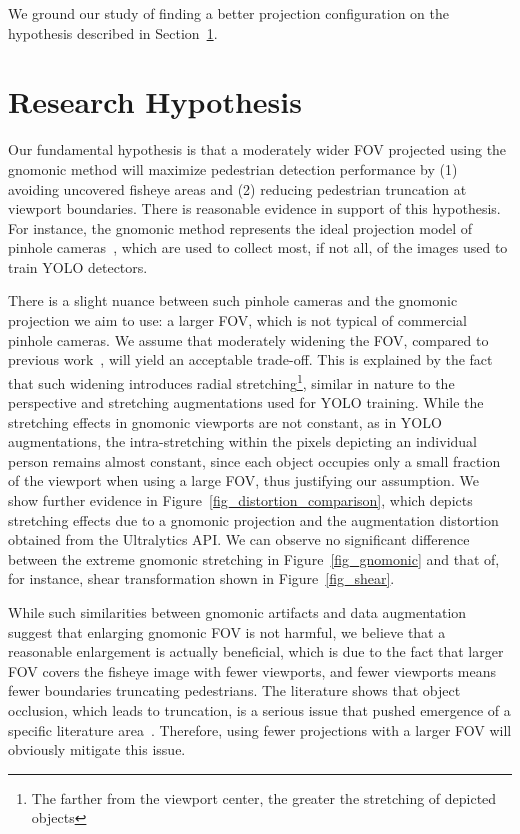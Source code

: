 \documentclass[twocolumn]{svjour3}          %
\begin{document}
We ground our study of finding a better projection configuration on the hypothesis described in Section~\ref{sec_hypothesis}.


\section{Research Hypothesis}
\label{sec_hypothesis}
Our fundamental hypothesis is that a moderately wider FOV projected using the gnomonic method will maximize pedestrian detection performance by (1) avoiding uncovered fisheye areas and (2) reducing pedestrian truncation at viewport boundaries. There is reasonable evidence in support of this hypothesis. For instance, the gnomonic method represents the ideal projection model of pinhole cameras~\cite{pegoraro2016handbook, billings2020silhonet}, which are used to collect most, if not all, of the images used to train YOLO detectors. 

There is a slight nuance between such pinhole cameras and the gnomonic projection we aim to use: a larger FOV, which is not typical of commercial pinhole cameras. We assume that moderately widening the FOV, compared to previous work~\cite{chiang2021efficient}, will yield an acceptable trade-off. This is explained by the fact that such widening introduces radial stretching\footnote{The farther from the viewport center, the greater the stretching of depicted objects}, similar in nature to the perspective and stretching augmentations used for YOLO training. While the stretching effects in gnomonic viewports are not constant, as in YOLO augmentations, the intra-stretching within the pixels depicting an individual person remains almost constant, since each object occupies only a small fraction of the viewport when using a large FOV, thus justifying our assumption. We show further evidence in Figure~\ref{fig_distortion_comparison}, which depicts stretching effects due to a gnomonic projection and the augmentation distortion obtained from the Ultralytics API. We can observe no significant difference between the extreme gnomonic stretching in Figure~\ref{fig_gnomonic} and that of, for instance, shear transformation shown in Figure~\ref{fig_shear}.

While such similarities between gnomonic artifacts and data augmentation suggest that enlarging gnomonic FOV is not harmful, we believe that a reasonable enlargement is actually beneficial, which is due to the fact that larger FOV covers the fisheye image with fewer viewports, and fewer viewports means fewer boundaries truncating pedestrians. The literature shows that object occlusion, which leads to truncation, is a serious issue that pushed emergence of a specific literature area~\cite{ruan2023review, ryu2021detection}. Therefore, using fewer projections with a larger FOV will obviously mitigate this issue. 
\end{document}
